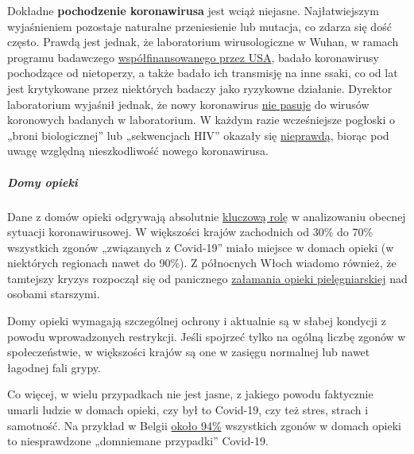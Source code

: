 \begin{itemize}
  Dokładne \textbf{pochodzenie koronawirusa} jest wciąż niejasne.
  Najłatwiejszym wyjaśnieniem pozostaje naturalne przeniesienie lub
  mutacja, co zdarza się dość często. Prawdą jest jednak, że
  laboratorium wirusologiczne w Wuhan, w ramach programu badawczego
  \href{https://www.newsweek.com/dr-fauci-backed-controversial-wuhan-lab-millions-us-dollars-risky-coronavirus-research-1500741}{współfinansowanego
  przez USA}, badało koronawirusy pochodzące od nietoperzy, a także
  badało ich transmisję na inne ssaki, co od lat jest krytykowane przez
  niektórych badaczy jako ryzykowne działanie. Dyrektor laboratorium
  wyjaśnił jednak, że nowy koronawirus
  \href{https://www.scientificamerican.com/article/how-chinas-bat-woman-hunted-down-viruses-from-sars-to-the-new-coronavirus1/}{nie
  pasuje} do wirusów koronowych badanych w laboratorium. W każdym razie
  wcześniejsze pogłoski o „broni biologicznej'' lub „sekwencjach HIV''
  okazały się
  \href{https://onlinelibrary.wiley.com/doi/full/10.1111/eci.13222}{nieprawdą},
  biorąc pod uwagę względną nieszkodliwość nowego koronawirusa.
\end{itemize}

\hypertarget{domy-opieki}{%
\subparagraph{\texorpdfstring{\textbf{Domy
opieki}}{Domy opieki}}\label{domy-opieki}}

Dane z domów opieki odgrywają absolutnie
\href{https://ltccovid.org/2020/04/12/mortality-associated-with-covid-19-outbreaks-in-care-homes-early-international-evidence/}{kluczową
rolę} w analizowaniu obecnej sytuacji koronawirusowej. W większości
krajów zachodnich od 30\% do 70\% wszystkich zgonów „związanych z
Covid-19'' miało miejsce w domach opieki (w niektórych regionach nawet
do 90\%). Z północnych Włoch wiadomo również, że tamtejszy kryzys
rozpoczął się od panicznego
\href{https://swprs.org/covid-19-a-report-from-italy/}{załamania opieki
pielęgniarskiej} nad osobami starszymi.

Domy opieki wymagają szczególnej ochrony i aktualnie są w słabej
kondycji z powodu wprowadzonych restrykcji. Jeśli spojrzeć tylko na
ogólną liczbę zgonów w społeczeństwie, w większości krajów są one w
zasięgu normalnej lub nawet łagodnej fali grypy.

Co więcej, w wielu przypadkach nie jest jasne, z jakiego powodu
faktycznie umarli ludzie w domach opieki, czy był to Covid-19, czy też
stres, strach i samotność. Na przykład w Belgii
\href{https://covid-19.sciensano.be/sites/default/files/Covid19/Meest\%20recente\%20update.pdf}{około
94\%} wszystkich zgonów w domach opieki to niesprawdzone „domniemane
przypadki'' Covid-19.

